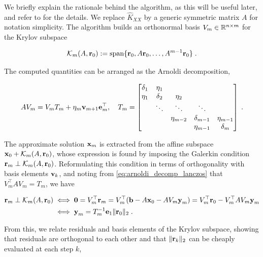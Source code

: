 \documentclass{article}
\begin{document}
We briefly explain the rationale behind the algorithm, as this will be useful later, and refer to \cite{saad_iterative_2003, golub_matrix_2013} for the details. We replace $\widehat K_{XX}$ by a generic symmetric matrix $A$ for notation simplicity. The algorithm builds an orthonormal basis $V_m \in \mathbb R^{n \times m}$ for the Krylov subspace 

\begin{equation*}
    \mathcal K_m( A, \boldsymbol{\mathbf{r}}_0) := \text{span}\{\boldsymbol{\mathbf{r}}_0,  A \boldsymbol{\mathbf{r}}_0, \ldots,  A^{m-1} \boldsymbol{\mathbf{r}}_0\} \; .
\end{equation*}

The computed quantities can be arranged as the Arnoldi decomposition, 

\begin{equation} \label{eq:arnoldi_decomp_lanczos}
    A V_m = V_m T_m + \eta_{m} \boldsymbol{\mathbf{v}}_{m+1} \boldsymbol{\mathbf{e}}_m^\top, \quad T_m = \begin{bmatrix}
        \delta_1 & \eta_1   &              &               & \\
        \eta_1   & \delta_2 & \eta_2       &               & \\
                 & \ddots   & \ddots       & \ddots        & \\
                 &          & \eta_{m-2}   & \delta_{m-1}  & \eta_{m-1} \\
                 &          &              & \eta_{m-1}   & \delta_m
    \end{bmatrix} \;.
\end{equation}

The approximate solution $\boldsymbol{\mathbf{x}}_m$ is extracted from the affine subspace $\boldsymbol{\mathbf{x}}_0 + \mathcal K_m(A, \boldsymbol{\mathbf{r}}_0)$, whose expression is found by imposing the Galerkin condition $\boldsymbol{\mathbf{r}}_m \perp \mathcal K_m(A, \boldsymbol{\mathbf{r}}_0)$. Reformulating this condition in terms of orthogonality with basis elements $\boldsymbol{\mathbf{v}}_k$, and noting from \eqref{eq:arnoldi_decomp_lanczos} that $V_m^\top A V_m = T_m$, we have

\begin{align} \label{eq:lanczos_solution}
    \boldsymbol{\mathbf{r}}_m \perp \mathcal K_m(A, \boldsymbol{\mathbf{r}}_0)
    &\iff 
    \boldsymbol{\mathbf{0}} = V_m^\top \boldsymbol{\mathbf{r}}_m = V_m^\top (\boldsymbol{\mathbf{b}} - A \boldsymbol{\mathbf{x}}_0 - A V_m \boldsymbol{\mathbf{y}}_m) = V_m^\top \boldsymbol{\mathbf{r}}_0 - V_m^\top A V_m \boldsymbol{\mathbf{y}}_m \nonumber\\ 
    &\iff \boldsymbol{\mathbf{y}}_m = T_m^{-1} \boldsymbol{\mathbf{e}}_1 \Vert \boldsymbol{\mathbf{r}}_0 \Vert_2 \; .
\end{align}

From this, we relate residuals and basis elements of the Krylov subspace, showing that residuals are orthogonal to each other and that $\Vert \boldsymbol{\mathbf{r}}_k \Vert_2$ can be cheaply evaluated at each step $k$,
\end{document}
